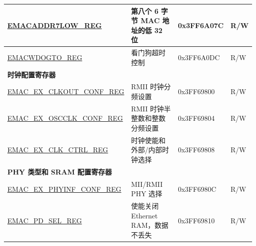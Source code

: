 \begin{longtable}{ |m{5cm} |m{6.3cm} | m{2cm} | m{2.2cm} | }
\hyperref[regdesc:EMACADDR7LOWREG]{EMACADDR7LOW\_REG} & 第八个 6 字节 MAC 地址的低 32 位 & 0x3FF6A07C & R/W \\ \hline
\hyperref[regdesc:EMACWDOGTOREG]{EMACWDOGTO\_REG} & 看门狗超时控制& 0x3FF6A0DC & R/W \\ \hline
\multicolumn{4}{|l|}{\textbf{时钟配置寄存器}} \\ \hline
\hyperref[regdesc:EMACEXCLKOUTCONFREG]{EMAC\_EX\_CLKOUT\_CONF\_REG} & RMII 时钟分频设置 & 0x3FF69800 & R/W \\ \hline
\hyperref[regdesc:EMACEXOSCCLKCONFREG]{EMAC\_EX\_OSCCLK\_CONF\_REG} & RMII 时钟半整数和整数分频设置  & 0x3FF69804 & R/W \\ \hline
\hyperref[regdesc:EMACEXCLKCTRLREG]{EMAC\_EX\_CLK\_CTRL\_REG} &  时钟使能和外部/内部时钟选择& 0x3FF69808 & R/W \\ \hline
\multicolumn{4}{|l|}{\textbf{PHY 类型和 SRAM 配置寄存器}} \\ \hline
\hyperref[regdesc:EMACEXPHYINFCONFREG]{EMAC\_EX\_PHYINF\_CONF\_REG} & MII/RMII PHY 选择 & 0x3FF6980C & R/W \\ \hline
\hyperref[regdesc:EMACPDSELREG]{EMAC\_PD\_SEL\_REG} & 使能关闭 Ethernet RAM，数据不丢失 & 0x3FF69810 & R/W \\ \hline
\end{longtable}

